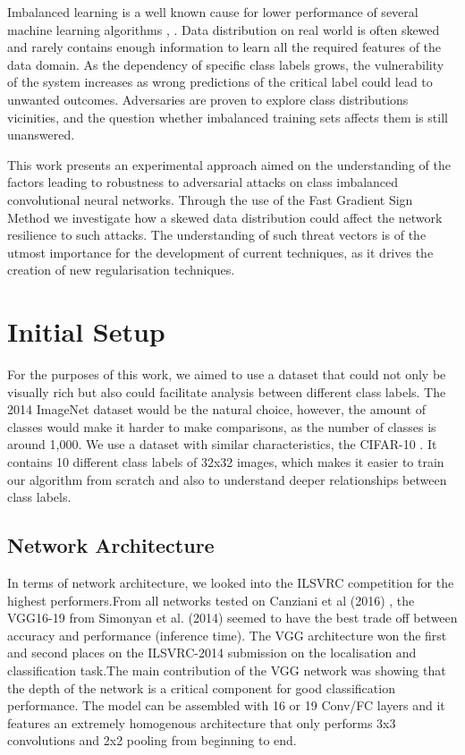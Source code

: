 \documentclass[runningheads,a4paper]{llncs}
\begin{document}
Imbalanced learning is a well known cause for lower performance of several machine learning algorithms \cite{japkowicz2002class}, \cite{krawczyk2016learning}. Data distribution on real world is often skewed and rarely contains enough information to learn all the required features of the data domain. As the dependency of specific class labels grows, the vulnerability of the system increases as wrong predictions of the critical label could lead to unwanted outcomes. Adversaries are proven to explore class distributions vicinities, and the question whether imbalanced training sets affects them is still unanswered.

This work presents an experimental approach aimed on the understanding of the factors leading to robustness to adversarial attacks on class imbalanced convolutional neural networks. Through the use of the Fast Gradient Sign Method we investigate how a skewed data distribution could affect the network resilience to such attacks. The understanding of such threat vectors is of the utmost importance for the development of current techniques, as it drives the creation of new regularisation techniques.






\section{Initial Setup}

For the purposes of this work, we aimed to use a dataset that could not only be visually rich but also could facilitate analysis between different class labels. The 2014 ImageNet dataset \cite{deng2009imagenet} would be the natural choice, however, the amount of classes would make it harder to make comparisons, as the number of classes is around 1,000. We use a dataset with similar characteristics, the CIFAR-10 \cite{krizhevsky_2009}. It contains 10 different class labels of 32x32 images, which makes it easier to train our algorithm from scratch and also to understand deeper relationships between class labels.
\subsection{Network Architecture}
In terms of network architecture, we looked into the ILSVRC competition for the highest performers.From all networks tested on Canziani et al (2016) \cite{canziani2016analysis}, the VGG16-19 from Simonyan et al. (2014) \cite{simonyan2014very}  seemed to have the best trade off between accuracy and performance (inference time). The VGG architecture won the first and second places on the ILSVRC-2014 submission on the localisation and classification task.The main contribution of the VGG network was showing that the depth of the network is a critical component for good classification performance. The model can be assembled with 16 or 19 Conv/FC layers and it features an extremely homogenous architecture that only performs 3x3 convolutions and 2x2 pooling from beginning to end.
\end{document}

